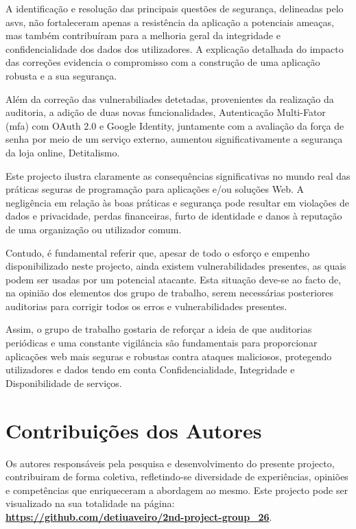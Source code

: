 A identificação e resolução das principais questões de segurança, delineadas pelo \ac{asvs}, não fortaleceram apenas a resistência da aplicação a potenciais ameaças, mas também contribuíram para a melhoria geral da integridade e confidencialidade dos dados dos utilizadores. A explicação detalhada do impacto das correções evidencia o compromisso com a construção de uma aplicação robusta e a sua segurança.

Além da correção das vulnerabiliades detetadas, provenientes da realização da auditoria, a adição de duas novas funcionalidades, Autenticação Multi-Fator (\ac{mfa}) com OAuth 2.0 e Google Identity, juntamente com a avaliação da força de senha por meio de um serviço externo, aumentou significativamente a segurança da loja online, Detitalismo.

Este projecto ilustra claramente as consequências significativas no mundo real das práticas seguras de programação para aplicações e/ou soluções Web. A negligência em relação às boas práticas e segurança pode resultar em violações de dados e privacidade, perdas financeiras, furto de identidade e danos à reputação de uma organização ou utilizador comum.

Contudo, é fundamental referir que, apesar de todo o esforço e empenho disponibilizado neste projecto, ainda existem vulnerabilidades presentes, as quais podem ser usadas por um potencial atacante. Esta situação deve-se ao facto de, na opinião dos elementos dos grupo de trabalho, serem necessárias posteriores auditorias para corrigir todos os erros e vulnerabilidades presentes.

Assim, o grupo de trabalho gostaria de reforçar a ideia de que auditorias periódicas e uma constante vigilância são fundamentais para proporcionar aplicações web mais seguras e robustas contra ataques maliciosos, protegendo utilizadores e dados tendo em conta Confidencialidade, Integridade e Disponibilidade de serviços.

%
% 
\chapter*{Contribuições dos Autores}

        Os autores responsáveis pela pesquisa e desenvolvimento do presente projecto, contribuiram de forma coletiva, refletindo-se diversidade de experiências, opiniões e competências que enriqueceram a abordagem ao mesmo. Este projecto pode ser visualizado na sua totalidade na página: \textbf{\url{https://github.com/detiuaveiro/2nd-project-group_26}}. \\

